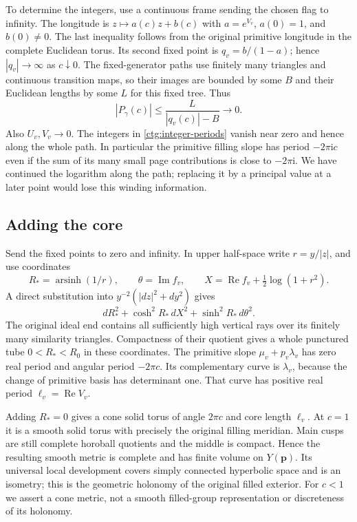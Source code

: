 \documentclass[11pt]{article}
\numberwithin{equation}{section}
\theoremstyle{definition}
\theoremstyle{remark}
\newcommand{\ii}{\mathrm i}
\newcommand{\Rea}{\operatorname{Re}}
\newcommand{\Ima}{\operatorname{Im}}
\newcommand{\arsinh}{\operatorname{arsinh}}
\begin{document}
To determine the integers, use a continuous frame sending the chosen
flag to infinity. The longitude is $z\mapsto a(c)z+b(c)$ with
$a=e^{V_v}$, $a(0)=1$, and $b(0)\ne0$. The last inequality follows
from the original primitive longitude in the complete Euclidean torus.
Its second fixed point is $q_v=b/(1-a)$; hence $|q_v|\to\infty$ as
$c\downarrow0$. The fixed-generator paths use finitely many triangles
and continuous transition maps, so their images are bounded by some
$B$ and their Euclidean lengths by some $L$ for this fixed tree. Thus
\begin{equation}\label{ctg:period-limit}
 |P_\gamma(c)|\le\frac{L}{|q_v(c)|-B}\longrightarrow0.
\end{equation}
Also $U_v,V_v\to0$. The integers in \eqref{ctg:integer-periods}
vanish near zero and hence along the whole path. In particular the
primitive filling slope has period $-2\pi\ii c$ even if the
sum of its many small page contributions is close to $-2\pi\ii$.
We have continued the logarithm along the path; replacing it by a
principal value at a later point would lose this winding information.

\subsection{Adding the core}
Send the fixed points to zero and infinity. In upper half-space write
$r=y/|z|$, and use coordinates
\begin{equation}\label{ctg:tube-coordinates}
 R_*=\arsinh(1/r),\qquad \theta=\Ima f_v,\qquad
 X=\Rea f_v+\tfrac12\log(1+r^2).
\end{equation}
A direct substitution into $y^{-2}(|dz|^2+dy^2)$ gives
\begin{equation}\label{ctg:tube-metric}
 dR_*^2+\cosh^2R_*\,dX^2+\sinh^2R_*\,d\theta^2.
\end{equation}
The original ideal end contains all sufficiently high vertical rays
over its finitely many similarity triangles. Compactness of their
quotient gives a whole punctured tube $0<R_*<R_0$ in these coordinates.
The primitive slope $\mu_v+p_v\lambda_v$ has zero real period and
angular period $-2\pi c$. Its complementary curve is $\lambda_v$,
because the change of primitive basis has determinant one. That curve
has positive real period $\ell_v=\Rea V_v$.

Adding $R_*=0$ gives a cone solid torus of angle $2\pi c$ and core
length $\ell_v$. At $c=1$ it is a smooth solid torus with precisely
the original filling meridian. Main cusps are still complete horoball
quotients and the middle is compact. Hence the resulting smooth metric
is complete and has finite volume on $Y(\mathbf p)$. Its universal
local development covers simply connected hyperbolic space and is an
isometry; this is the geometric holonomy of the original filled
exterior. For $c<1$ we assert a cone metric, not a smooth filled-group
representation or discreteness of its holonomy.
\end{document}
